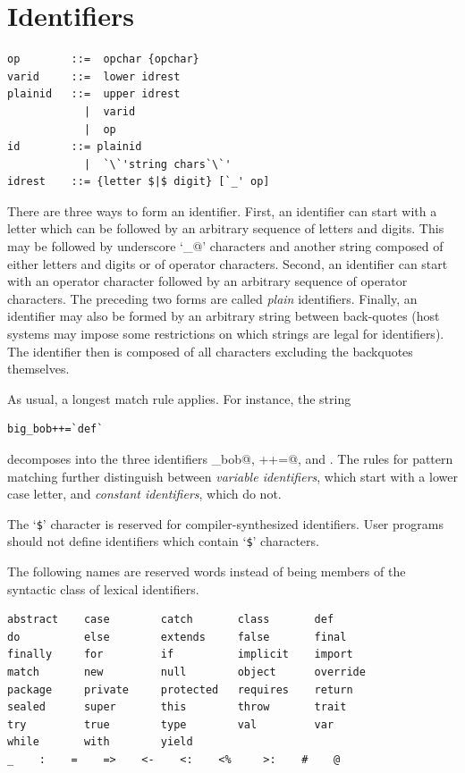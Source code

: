 \section{Identifiers}\label{sec:idents}

\syntax\begin{lstlisting}
op        ::=  opchar {opchar}
varid     ::=  lower idrest
plainid   ::=  upper idrest
            |  varid
            |  op
id        ::= plainid
            |  `\`'string chars`\`'
idrest    ::= {letter $|$ digit} [`_' op]
\end{lstlisting}

There are three ways to form an identifier. First, an identifier can
start with a letter which can be followed by an arbitrary sequence of
letters and digits. This may be followed by underscore `\lstinline@_@'
characters and another string composed of either letters and digits or
of operator characters.  Second, an identifier can start with an operator 
character followed by an arbitrary sequence of operator characters.
The preceding two forms are called {\em plain} identifiers.  Finally,
an identifier may also be formed by an arbitrary string between
back-quotes (host systems may impose some restrictions on which
strings are legal for identifiers).  The identifier then is composed
of all characters excluding the backquotes themselves.
 
As usual, a longest match rule applies. For instance, the string

\begin{lstlisting}
big_bob++=`def`
\end{lstlisting}

decomposes into the three identifiers \lstinline@big_bob@, \lstinline@++=@, and
.  The rules for pattern matching further distinguish between
{\em variable identifiers}, which start with a lower case letter, and
{\em constant identifiers}, which do not.


The `\lstinline[mathescape=false]@$@'\comment{$} character is reserved
for compiler-synthesized identifiers.  User programs should not define
identifiers which contain `\lstinline[mathescape=false]@$@'\comment{$}
characters.

The following names are reserved words instead of being members of the
syntactic class  of lexical identifiers.

\begin{lstlisting}
abstract    case        catch       class       def    
do          else        extends     false       final    
finally     for         if          implicit    import      
match       new         null        object      override    
package     private     protected   requires    return      
sealed      super       this        throw       trait
try         true        type        val         var         
while       with        yield
_    :    =    =>    <-    <:    <%     >:    #    @
\end{lstlisting}

